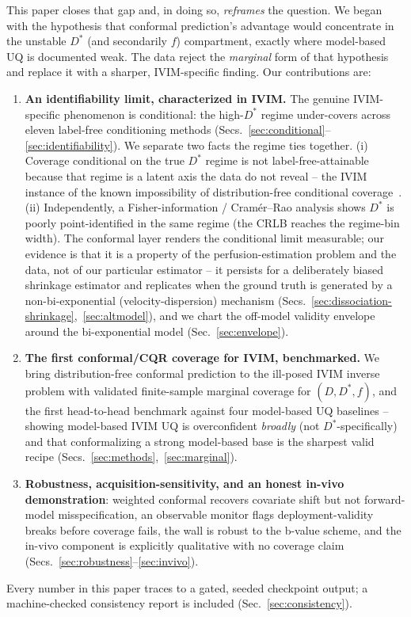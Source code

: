 \documentclass[11pt]{article}
\newcommand{\Dstar}{D^{*}}
\begin{document}
This paper closes that gap and, in doing so, \emph{reframes} the question. We began
with the hypothesis that conformal prediction's advantage would concentrate in the
unstable $\Dstar$ (and secondarily $f$) compartment, exactly where model-based UQ
is documented weak. The data reject the \emph{marginal} form of that hypothesis and
replace it with a sharper, IVIM-specific finding. Our contributions are:
\begin{enumerate}
\item \textbf{An identifiability limit, characterized in IVIM.} The genuine
IVIM-specific phenomenon is conditional: the high-$\Dstar$ regime under-covers
across eleven label-free conditioning methods
(Secs.~\ref{sec:conditional}--\ref{sec:identifiability}). We separate two facts the
regime ties together. (i) Coverage conditional on the true $\Dstar$ regime is not
label-free-attainable because that regime is a latent axis the data do not reveal
-- the IVIM instance of the known impossibility of distribution-free conditional
coverage~\citep{barber2021limits}. (ii) Independently, a Fisher-information /
Cram\'er--Rao analysis shows $\Dstar$ is poorly point-identified in the same regime
(the CRLB reaches the regime-bin width). The conformal layer renders the
conditional limit measurable; our evidence is that it is a property of the
perfusion-estimation problem and the data, not of our particular estimator -- it
persists for a deliberately biased shrinkage estimator and replicates when the
ground truth is generated by a non-bi-exponential (velocity-dispersion) mechanism
(Secs.~\ref{sec:dissociation-shrinkage},~\ref{sec:altmodel}), and we chart the
off-model validity envelope around the bi-exponential model
(Sec.~\ref{sec:envelope}).
\item \textbf{The first conformal/CQR coverage for IVIM, benchmarked.} We bring
distribution-free conformal prediction to the ill-posed IVIM inverse problem with
validated finite-sample marginal coverage for $(D,\Dstar,f)$, and the first
head-to-head benchmark against four model-based UQ baselines -- showing model-based
IVIM UQ is overconfident \emph{broadly} (not $\Dstar$-specifically) and that
conformalizing a strong model-based base is the sharpest valid recipe
(Secs.~\ref{sec:methods},~\ref{sec:marginal}).
\item \textbf{Robustness, acquisition-sensitivity, and an honest in-vivo
demonstration}: weighted conformal recovers covariate shift but not
forward-model misspecification, an observable monitor flags deployment-validity
breaks before coverage fails, the wall is robust to the b-value scheme, and the
in-vivo component is explicitly qualitative with no coverage claim
(Secs.~\ref{sec:robustness}--\ref{sec:invivo}).
\end{enumerate}
Every number in this paper traces to a gated, seeded checkpoint output; a
machine-checked consistency report is included (Sec.~\ref{sec:consistency}).
\end{document}
